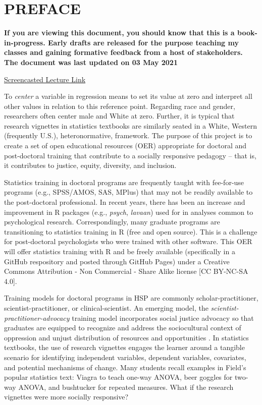 \documentclass[
  english,
]{book}
\begin{document}
\hypertarget{preface}{%
\chapter*{PREFACE}\label{preface}}

\textbf{If you are viewing this document, you should know that this is a book-in-progress. Early drafts are released for the purpose teaching my classes and gaining formative feedback from a host of stakeholders. The document was last updated on 03 May 2021}

\href{https://spu.hosted.panopto.com/Panopto/Pages/Viewer.aspx?id=c932455e-ef06-444a-bdca-acf7012d759a}{Screencasted Lecture Link}

To \emph{center} a variable in regression means to set its value at zero and interpret all other values in relation to this reference point. Regarding race and gender, researchers often center male and White at zero. Further, it is typical that research vignettes in statistics textbooks are similarly seated in a White, Western (frequently U.S.), heteronormative, framework. The purpose of this project is to create a set of open educational resources (OER) appropriate for doctoral and post-doctoral training that contribute to a socially responsive pedagogy -- that is, it contributes to justice, equity, diversity, and inclusion.

Statistics training in doctoral programs are frequently taught with fee-for-use programs (e.g., SPSS/AMOS, SAS, MPlus) that may not be readily available to the post-doctoral professional. In recent years, there has been an increase and improvement in R packages (e.g., \emph{psych}, \emph{lavaan}) used for in analyses common to psychological research. Correspondingly, many graduate programs are transitioning to statistics training in R (free and open source). This is a challenge for post-doctoral psychologists who were trained with other software. This OER will offer statistics training with R and be freely available (specifically in a GitHub respository and posted through GitHub Pages) under a Creative Commons Attribution - Non Commercial - Share Alike license {[}CC BY-NC-SA 4.0{]}.

Training models for doctoral programs in HSP are commonly scholar-practitioner, scientist-practitioner, or clinical-scientist. An emerging model, the \emph{scientist-practitioner-advocacy} training model incorporates social justice advocacy so that graduates are equipped to recognize and address the sociocultural context of oppression and unjust distribution of resources and opportunities \citep{mallinckrodt_scientist-practitioner-advocate_2014}. In statistics textbooks, the use of research vignettes engages the learner around a tangible scenario for identifying independent variables, dependent variables, covariates, and potential mechanisms of change. Many students recall examples in Field's \citeyearpar{field_discovering_2012} popular statistics text: Viagra to teach one-way ANOVA, beer goggles for two-way ANOVA, and bushtucker for repeated measures. What if the research vignettes were more socially responsive?
\end{document}
